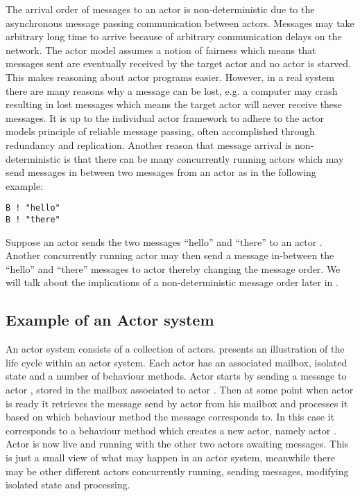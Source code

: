 The arrival order of messages to an actor is non-deterministic due to the asynchronous message passing communication between actors\cite[p. 2]{karmani2011actors}. Messages may take arbitrary long time to arrive because of arbitrary communication delays on the network. The actor model assumes a notion of fairness which means that messages sent are eventually received by the target actor and no actor is starved\cite[Chap. 2.5]{haller2012actors}\cite[p. 3]{karmani2009actor}. This makes reasoning about actor programs easier\cite{tasharofi2013scala}. However, in a real system there are many reasons why a message can be lost, e.g. a computer may crash resulting in lost messages which means the target actor will never receive these messages. It is up to the individual actor framework to adhere to the actor models principle of reliable message passing, often accomplished through redundancy and replication\cite[Chap. 2.5]{haller2012actors}. Another reason that message arrival is non-deterministic is that there can be many concurrently running actors which may send messages in between two messages from an actor as in the following example:
\begin{verbatim}
B ! "hello"
B ! "there"
\end{verbatim}
Suppose an actor  sends the two messages ``hello'' and ``there'' to an actor . Another concurrently running actor  may then send a message in-between the ``hello'' and ``there'' messages to actor  thereby changing the message order. We will talk about the implications of a non-deterministic message order later in .

\subsection{Example of an Actor system}
An actor system consists of a collection of actors.  presents an illustration of the life cycle within an actor system. Each actor has an associated mailbox, isolated state and a number of behaviour methods. Actor  starts by sending a message to actor , stored in the mailbox associated to actor . Then at some point when actor  is ready it retrieves the message send by actor  from his mailbox and processes it based on which behaviour method the message corresponds to. In this case it corresponds to a behaviour method which creates a new actor, namely actor . Actor  is now live and running with the other two actors awaiting messages. This is just a small view of what may happen in an actor system, meanwhile there may be other different actors concurrently running, sending messages, modifying isolated state and processing.


